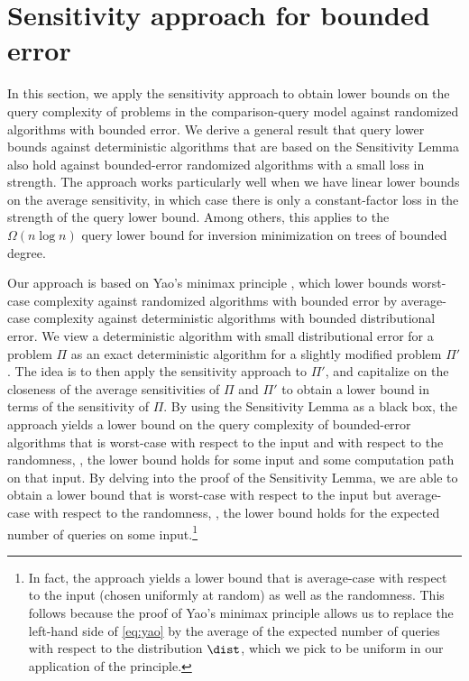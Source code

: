 \section{Sensitivity approach for bounded error}
\label{sec:random}

In this section, we apply the sensitivity approach to obtain lower bounds on the query complexity of problems in the comparison-query model against randomized algorithms with bounded error. We derive a general
%
result that query lower bounds against deterministic algorithms that are based on the Sensitivity
%
Lemma also  %
hold against bounded-error randomized algorithms with a small loss in strength. The approach works particularly well when we have linear lower bounds on the average sensitivity, in which case there is only a constant-factor loss in the strength of the query lower bound. Among others, this applies to the $\Omega(n \log n)$ query lower bound for inversion minimization on trees of bounded degree.

%
%

Our approach is based on Yao's minimax principle \cite{Yao77}, which lower bounds worst-case complexity against randomized algorithms with bounded error by average-case complexity against deterministic algorithms with bounded distributional error. We view a deterministic algorithm with small distributional error for a problem $\Pi$ as an exact deterministic algorithm for a slightly modified problem $\Pi'$. The idea is to then apply the sensitivity approach to $\Pi'$, and capitalize on the closeness of the average sensitivities of $\Pi$ and $\Pi'$ to obtain a lower bound in terms of the sensitivity of $\Pi$. By using the Sensitivity Lemma as a %
black box,  %
the approach yields a lower bound on the query complexity of bounded-error algorithms that is worst-case with respect to the input and with respect to the randomness, \ie, the lower bound holds for some input and some computation path on that input. By delving into the proof of the Sensitivity Lemma, we are able to obtain a lower bound that is worst-case with respect to the input but average-case with respect to the randomness, \ie, the lower bound holds for the expected number of queries on some input.\footnote{In fact, the approach yields a lower bound that is average-case with respect to the input (chosen uniformly at random) as well as the randomness. This follows because the proof of Yao's minimax principle allows us to replace the left-hand side of \eqref{eq:yao} by the average of the expected number of queries with respect to the distribution $\dist$, which we pick to be uniform in our application of the principle.}


